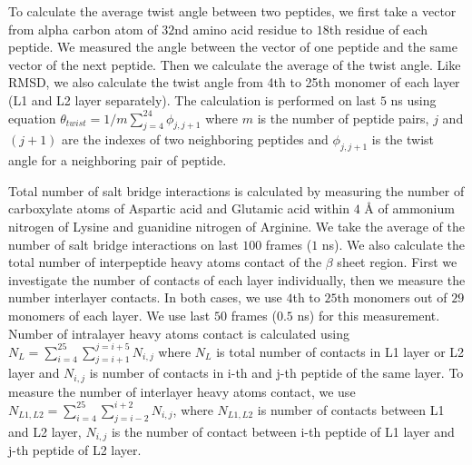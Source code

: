 \documentclass[journal=jacsat,manuscript=communication]{achemso}
\begin{document}

To calculate the average twist angle between two peptides, we first take a
vector from alpha carbon atom of $32$nd amino acid residue to $18$th residue of
each peptide. We measured the angle between the vector of one peptide and the
same vector of the next peptide. Then we calculate the average of the twist
angle. Like RMSD, we also calculate the twist angle from 4th to 25th monomer of
each layer (L1 and L2 layer separately). The calculation is performed on last
$5$ ns using equation $\theta_{twist} = 1/m \sum_{j=4}^{24} \phi_{j,j+1}$ 
where $m$ is the number of peptide pairs, $j$ and $(j+1)$ are the indexes of two
neighboring peptides and $\phi_{j,j+1}$ is the twist angle for a neighboring
pair of peptide.

Total number of salt bridge interactions is calculated by measuring the number
of carboxylate atoms of Aspartic acid and Glutamic acid within $4$ {\AA} of
ammonium nitrogen of Lysine and guanidine nitrogen of Arginine. We take the
average of the number of salt bridge interactions on last $100$ frames ($1$ ns).
We also calculate the total number of interpeptide heavy atoms contact of the
$\beta$ sheet region. First we investigate the number of contacts of each layer
individually, then we measure the number interlayer contacts. In both cases, we
use $4$th to $25$th monomers out of $29$ monomers of each layer. We use last
$50$ frames ($0.5$ ns) for this measurement. Number of intralayer heavy atoms
contact is calculated using $N_{L} = \sum_{i=4}^{25}\sum_{j=i+1}^{j=i+5}
N_{i,j}$ where $N_{L}$ is total number of contacts in L1 layer or L2 layer
and $N_{i,j}$ is number of contacts in i-th and j-th peptide of the same layer.
To measure the number of interlayer heavy atoms contact, we use $N_{L1,L2} =
\sum_{i=4}^{25}\sum_{j=i-2}^{i+2}N_{i,j}$, where $N_{L1,L2}$ is number of
contacts between L1 and L2 layer, $N_{i,j}$ is the number of contact between
i-th peptide of L1 layer and j-th peptide of L2 layer. 
\end{document}
